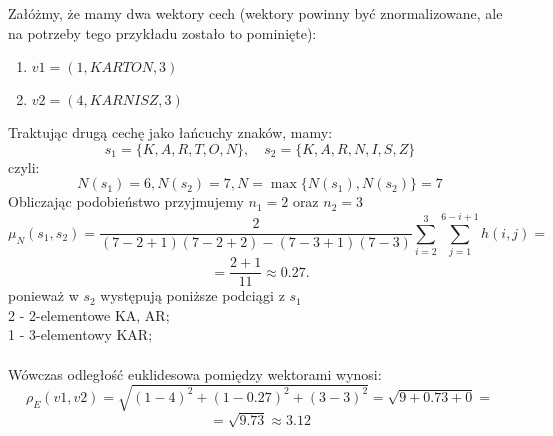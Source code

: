 \documentclass{article}
\begin{document}
Załóżmy, że mamy dwa wektory cech (wektory powinny być znormalizowane, ale na potrzeby tego przykładu zostało to pominięte):
\begin{enumerate}
    \item \(v1 = (1, KARTON, 3)\)
    \item \(v2 = (4, KARNISZ, 3)\)
\end{enumerate}
Traktując drugą cechę jako łańcuchy znaków, mamy:
\[
s_1 = \{K, A, R, T, O, N\}, \quad s_2 = \{K, A, R, N, I, S, Z\}
\]
czyli:\\
\[
N(s_1) = 6, N(s_2) = 7, N = \max \{N(s_1), N(s_2)\} = 7
\]
Obliczając podobieństwo przyjmujemy \(n_1 = 2\) oraz \(n_2 = 3\) 
\[
    \mu_N(s_1, s_2) = \frac{2}{(7 - 2 + 1)(7 - 2 + 2) - (7 - 3 + 1)(7 - 3)} \sum_{i=2}^{3} \sum_{j=1}^{6 - i + 1} h(i, j) = 
 \]
 \[
     = \frac{2 + 1}{11} \approx 0.27.
 \]
 ponieważ w \(s_2\) występują poniższe podciągi z \(s_1\)\\
 2 - 2-elementowe KA, AR;\\
 1 - 3-elementowy KAR;\\
 \\Wówczas odległość euklidesowa pomiędzy wektorami wynosi:
 \[
     \rho_E(v1, v2) = \sqrt{(1-4)^2 + (1 - 0.27)^2 + (3-3)^2} = \sqrt{9 + 0.73 + 0} = 
\] 
\[
     = \sqrt{9.73} \approx 3.12
\] 
\end{document}
